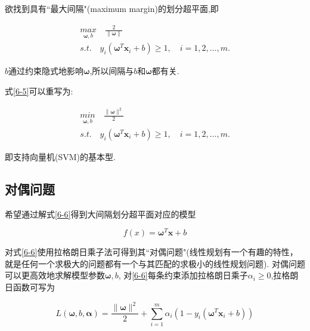 \documentclass[12pt]{article}
\numberwithin{equation}{section}%
\begin{document}
欲找到具有``最大间隔"(maximum margin)的划分超平面,即



\begin{equation}
\begin{split}        %
 {\underset{\boldsymbol{\omega},b}{max}} \quad \frac{2}{\parallel \boldsymbol{\omega} \parallel}  \\
 s.t. \quad y_{i}(\boldsymbol{\omega}^{T}\boldsymbol{x}_{i}+b) \geqslant 1, \quad i= 1,2, \ldots ,m.
\end{split}
\label{6-5}
\end{equation}

$b$通过约束隐式地影响$\boldsymbol{\omega}$,所以间隔与$b$和$\boldsymbol{\omega}$都有关.

式\ref{6-5}可以重写为:

\begin{equation}
\begin{split}        %
 {\underset{\boldsymbol{\omega},b}{min}} \quad \frac{\parallel \boldsymbol{\omega} \parallel^{2}}{2} \\
 s.t. \quad y_{i}(\boldsymbol{\omega}^{T}\boldsymbol{x}_{i}+b) \geqslant 1, \quad i= 1,2, \ldots ,m.
\end{split}
\label{6-6}
\end{equation}

即支持向量机(SVM)的基本型.

\subsection{对偶问题}

希望通过解式\ref{6-6}得到大间隔划分超平面对应的模型

\begin{equation}
f(x)=\boldsymbol{\omega}^{T}\boldsymbol{x}+b
\label{6-7}
\end{equation}

对式\ref{6-6}使用拉格朗日乘子法可得到其``对偶问题"(线性规划有一个有趣的特性，就是任何一个求极大的问题都有一个与其匹配的求极小的线性规划问题). 对偶问题可以更高效地求解模型参数$\boldsymbol{\omega}, b$, 对\ref{6-6}每条约束添加拉格朗日乘子$\alpha_{i} \geqslant 0$,拉格朗日函数可写为

\begin{equation}
L(\boldsymbol{\omega},b,\boldsymbol{\alpha})=\frac{\parallel \boldsymbol{\omega} \parallel^{2}}{2}+\sum_{i=1}^{m}\alpha_{i}(1-y_{i}(\boldsymbol{\omega}^{T}\boldsymbol{x}_{i}+b))
\label{6-8}
\end{equation}
\end{document}
